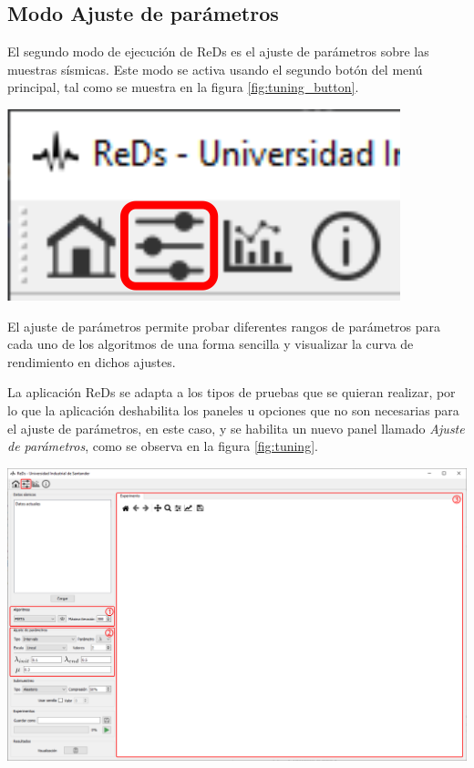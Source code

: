 \documentclass[12pt,twoside,letter]{ol-softwaremanual}
\newenvironment{Figure}
  {\par\medskip\noindent\minipage{\linewidth}}
  {\endminipage\par\medskip}
\begin{document}
\newpage
\subsection{Modo Ajuste de parámetros}

\begin{multicols}{2}

El segundo modo de ejecución de ReDs es el ajuste de parámetros sobre las muestras sísmicas. Este modo se activa usando el segundo botón del menú principal, tal como se muestra en la figura \ref{fig:tuning_button}.

\begin{Figure}
    \centering
    \includegraphics[width=0.4\linewidth]{tuning-tab.png}
    \label{fig:tuning_button}
\end{Figure}

\end{multicols}

El ajuste de parámetros permite probar diferentes rangos de parámetros para cada uno de los algoritmos de una forma sencilla y visualizar la curva de rendimiento en dichos ajustes.

La aplicación ReDs se adapta a los tipos de pruebas que se quieran realizar, por lo que la aplicación deshabilita los paneles u opciones que no son necesarias para el ajuste de parámetros, en este caso, y se habilita un nuevo panel llamado \emph{Ajuste de parámetros}, como se observa en la figura \ref{fig:tuning}.

\begin{Figure}
    \centering
    \includegraphics[width=1\linewidth]{tuning.png}
    \label{fig:tuning}
\end{Figure}
\end{document}
